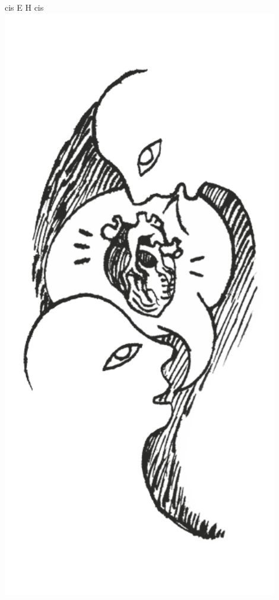 \documentclass[a5paper, 10pt]{book}
\begin{document}
\begin{minipage}[t]{0.2\textwidth}
cis E H cis\\
\includegraphics[width=0.9\textwidth]{images/lubie_mowic_z_toba.png}\\

\end{minipage}
\end{document}
